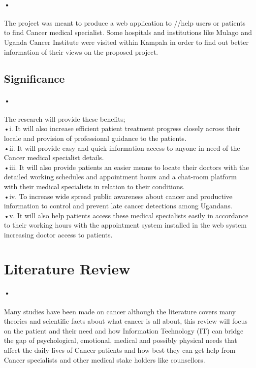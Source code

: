 \documentclass[12pt]{article}
\begin{document}
\paragraph{•}The project was meant to produce a web application to //help users or patients to find Cancer medical specialist. Some hospitals and institutions like Mulago and Uganda Cancer Institute were visited within Kampala in order to find out better information of their views on the proposed project.

\subsection{Significance}
\paragraph{•}The research will provide these benefits;
\\{•}i. It will also increase efficient patient treatment progress closely across their locale and provision of professional guidance to the patients.
\\{•}ii. It will provide easy and quick information access to anyone in need of the Cancer medical specialist details.
\\{•}iii. It will also provide patients an easier means to locate their doctors with the detailed working schedules and appointment hours and a chat-room platform with their medical specialists in relation to their conditions.
\\{•}iv. To increase wide spread public awareness about cancer and productive information to control and prevent late cancer detections among Ugandans.
\\{•}v. It will also help patients access these medical specialists easily in accordance to their working hours with the appointment system installed in the web system increasing doctor access to patients.


\section{Literature Review}
\paragraph{•} Many studies have been made on cancer although the literature covers many theories and scientific facts about what cancer is all about, this review will focus on the patient and their need and how Information Technology (IT) can bridge the gap of psychological, emotional, medical and possibly physical needs that affect the daily lives of Cancer patients and how best they can get help from Cancer specialists and other medical stake holders like counsellors. 
\end{document}
